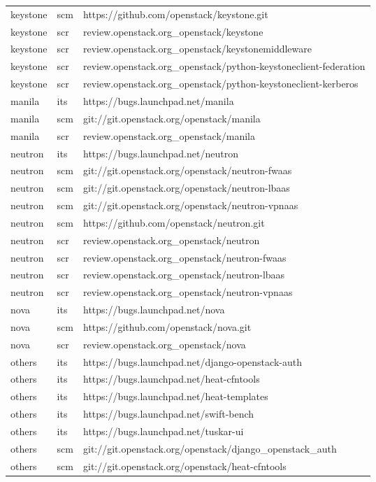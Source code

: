 \begin{center}
\begin{longtable}{|p{4cm}|p{1cm}|p{10cm}|}
keystone&scm&https://github.com/openstack/keystone.git\\ 
keystone&scr&review.openstack.org\_openstack/keystone\\ 
keystone&scr&review.openstack.org\_openstack/keystonemiddleware\\ 
keystone&scr&review.openstack.org\_openstack/python-keystoneclient-federation\\ 
keystone&scr&review.openstack.org\_openstack/python-keystoneclient-kerberos\\ 
manila&its&https://bugs.launchpad.net/manila\\ 
manila&scm&git://git.openstack.org/openstack/manila\\ 
manila&scr&review.openstack.org\_openstack/manila\\ 
neutron&its&https://bugs.launchpad.net/neutron\\ 
neutron&scm&git://git.openstack.org/openstack/neutron-fwaas\\ 
neutron&scm&git://git.openstack.org/openstack/neutron-lbaas\\ 
neutron&scm&git://git.openstack.org/openstack/neutron-vpnaas\\ 
neutron&scm&https://github.com/openstack/neutron.git\\ 
neutron&scr&review.openstack.org\_openstack/neutron\\ 
neutron&scr&review.openstack.org\_openstack/neutron-fwaas\\ 
neutron&scr&review.openstack.org\_openstack/neutron-lbaas\\ 
neutron&scr&review.openstack.org\_openstack/neutron-vpnaas\\ 
nova&its&https://bugs.launchpad.net/nova\\ 
nova&scm&https://github.com/openstack/nova.git\\ 
nova&scr&review.openstack.org\_openstack/nova\\ 
others&its&https://bugs.launchpad.net/django-openstack-auth\\ 
others&its&https://bugs.launchpad.net/heat-cfntools\\ 
others&its&https://bugs.launchpad.net/heat-templates\\ 
others&its&https://bugs.launchpad.net/swift-bench\\ 
others&its&https://bugs.launchpad.net/tuskar-ui\\ 
others&scm&git://git.openstack.org/openstack/django\_openstack\_auth\\ 
others&scm&git://git.openstack.org/openstack/heat-cfntools\\ 

\end{longtable}
\end{center}
